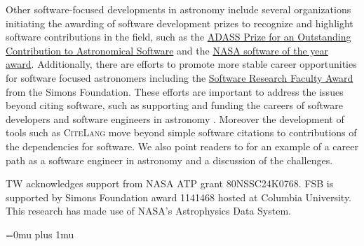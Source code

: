 \documentclass[twocolumn,linenumbers]{aastex631}
\begin{document}
Other software-focused developments in astronomy include  several organizations initiating the awarding of software development prizes to recognize and highlight software contributions in the field, such as the \href{https://www.adass.org.softwareprize.html}{ADASS Prize for an Outstanding Contribution to Astronomical Software} and the \href{https://www.nasa.gov/ames-exploration-technology/awards/}{NASA software of the year award}. Additionally, there are efforts to promote more stable career opportunities for software focused astronomers including the \href{https://www.simonsfoundation.org/grant/scientific-software-research-faculty-award/}{Software Research Faculty Award} from the Simons Foundation. These efforts are important to address the issues beyond citing software, such as supporting and funding the careers of software developers and software engineers in astronomy \citep[see the discussions in][]{2020arXiv200501469A, Bouquin:2023, carlin2023all, sochat2024infrastructure}. Moreover the development of tools such as \textsc{CiteLang} \citep{sochat2022citelang} move beyond simple software citations to contributions of the dependencies for software. We also point readers to \citet{Smith2022} for an example of a career path as a software engineer in astronomy and a discussion of the challenges.




\begin{acknowledgments}
TW acknowledges support from NASA ATP grant 80NSSC24K0768. FSB is supported by Simons Foundation award 1141468 hosted at Columbia University. This research has made use of NASA's Astrophysics Data System.
\end{acknowledgments}

\Urlmuskip=0mu plus 1mu\relax









\end{document}
